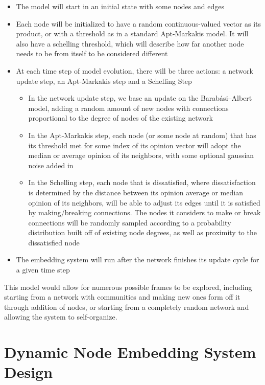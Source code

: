 \documentclass[10pt]{article}
\begin{document}
\begin{itemize}
\item The model will start in an initial state with some nodes and edges
\item Each node will be initialized to have a random continuous-valued vector as its product, or with a threshold as in a standard Apt-Markakis model. It will also have a schelling threshold, which will describe how far another node needs to be from itself to be considered different
\item At each time step of model evolution, there will be three actions: a network update step, an Apt-Markakis step and a Schelling Step
\begin{itemize}
\item In the network update step, we base an update on the Barabási–Albert model, adding a random amount of new nodes with connections proportional to the degree of nodes of the existing network
\item In the Apt-Markakis step, each node (or some node at random) that has its threshold met for some index of its opinion vector will adopt the median or average opinion of its neighbors, with some optional gaussian noise added in
\item In the Schelling step, each node that is dissatisfied, where dissatisfaction is determined by the distance between its opinion average or median opinion of its neighbors, will be able to adjust its edges until it is satisfied by making/breaking connections. The nodes it considers to make or break connections will be randomly sampled according to a probability distribution built off of existing node degrees, as well as proximity to the dissatisfied node
\end{itemize}
\item The embedding system will run after the network finishes its update cycle for a given time step 
\end{itemize}

This model would allow for numerous possible frames to be explored, including starting from a network with communities and making new ones form off it through addition of nodes, or starting from a completely random network and allowing the system to self-organize. \\



\pagebreak

\section{Dynamic Node Embedding System Design}
\end{document}
